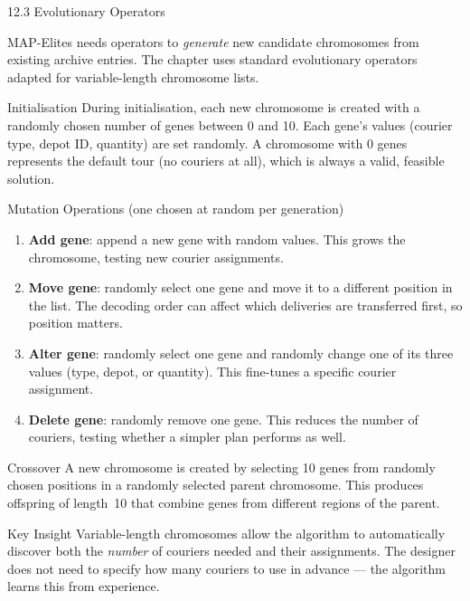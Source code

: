 \documentclass[aspectratio=169,10pt]{beamer}
\begin{document}
\begin{frame}[allowframebreaks]{12.3 Evolutionary Operators}

MAP-Elites needs operators to \emph{generate} new candidate chromosomes
from existing archive entries.
The chapter uses standard evolutionary operators adapted for
variable-length chromosome lists.

\medskip

\begin{block}{Initialisation}
  During initialisation, each new chromosome is created with a
  randomly chosen number of genes between 0 and 10.
  Each gene's values (courier type, depot ID, quantity) are
  set randomly.
  A chromosome with 0 genes represents the default tour
  (no couriers at all), which is always a valid, feasible solution.
\end{block}

\medskip

\begin{block}{Mutation Operations (one chosen at random per generation)}
  \begin{enumerate}
    \item \textbf{Add gene}: append a new gene with random values.
          This grows the chromosome, testing new courier assignments.
    \item \textbf{Move gene}: randomly select one gene and move it
          to a different position in the list.
          The decoding order can affect which deliveries are
          transferred first, so position matters.
    \item \textbf{Alter gene}: randomly select one gene and randomly
          change one of its three values (type, depot, or quantity).
          This fine-tunes a specific courier assignment.
    \item \textbf{Delete gene}: randomly remove one gene.
          This reduces the number of couriers, testing whether
          a simpler plan performs as well.
  \end{enumerate}
\end{block}

\medskip

\begin{block}{Crossover}
  A new chromosome is created by selecting 10 genes from randomly
  chosen positions in a randomly selected parent chromosome.
  This produces offspring of length~10 that combine genes
  from different regions of the parent.
\end{block}

\medskip

\begin{alertblock}{Key Insight}
  Variable-length chromosomes allow the algorithm to automatically
  discover both the \emph{number} of couriers needed and their
  assignments.
  The designer does not need to specify how many couriers to use
  in advance --- the algorithm learns this from experience.
\end{alertblock}

\end{frame}
\end{document}
